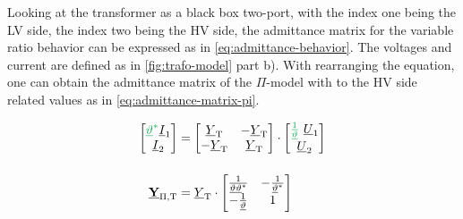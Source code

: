 Looking at the transformer as a black box two-port, with the index one being the \acs{LV} side, the index two being the \acs{HV} side, the admittance matrix for the variable ratio behavior can be expressed as in \autoref{eq:admittance-behavior}. 
The voltages and current are defined as in \autoref{fig:trafo-model} part b). 
With rearranging the equation, one can obtain the admittance matrix of the $\Pi$-model with to the \acs{HV} side related values as in \autoref{eq:admittance-matrix-pi}. \autocite{milano_2010,burlakin_2024}

\begin{align}
    \begin{bmatrix}
        {\color{ees_green}\underline{\vartheta}^*} \underline{I}_1 \\ \underline{I}_2
    \end{bmatrix}&= 
    \begin{bmatrix}
        \underline{Y}_\mathrm{T} & -\underline{Y}_\mathrm{T} \\
        -\underline{Y}_\mathrm{T} & \underline{Y}_\mathrm{T}
    \end{bmatrix} \cdot
    \begin{bmatrix}
        {\color{ees_green}\frac{1}{\underline{\vartheta}}}~\underline{U}_1 \\ \underline{U}_2
    \end{bmatrix} \label{eq:admittance-behavior} \\[12pt]
    \underline{\mab{Y}}_\mathrm{\Pi,T}&=\underline{Y}_\mathrm{T} \cdot
    \begin{bmatrix}
        \frac{1}{\underline{\vartheta}\underline{\vartheta}^*} & -\frac{1}{\underline{\vartheta}^*} \\
        -\frac{1}{\underline{\vartheta}} & 1
    \end{bmatrix} \label{eq:admittance-matrix-pi}
\end{align}

